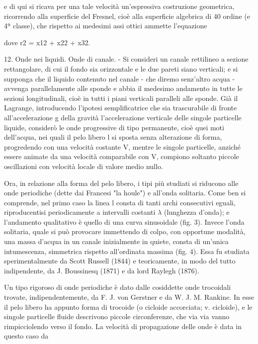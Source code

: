 \documentclass[a4paper]{article}
\begin{document}
e di qui si ricava per una tale velocità un'espressiva costruzione geometrica, ricorrendo alla superficie del Fresnel, cioè alla superficie algebrica di 40 ordine (e 4ª classe), che rispetto ai medesimi assi ottici ammette l'equazione

dove r2 = x12 + x22 + x32.

12. Onde nei liquidi. Onde di canale. - Si consideri un canale rettilineo a sezione rettangolare, di cui il fondo sia orizzontale e le due pareti siano verticali; e si supponga che il liquido contenuto nel canale - che diremo senz'altro acqua - avvenga parallelamente alle sponde e abbia il medesimo andamento in tutte le sezioni longitudinali, cioè in tutti i piani verticali paralleli alle sponde. Già il Lagrange, introducendo l'ipotesi semplificatrice che sia trascurabile di fronte all'accelerazione g della gravità l'accelerazione verticale delle singole particelle liquide, considerò le onde progressive di tipo permanente, cioè quei moti dell'acqua, nei quali il pelo libero l si sposta senza alterazione di forma, progredendo con una velocità costante V, mentre le singole particelle, anziché essere animate da una velocità comparabile con V, compiono soltanto piccole oscillazioni con velocità locale di valore medio nullo.

Ora, in relazione alla forma del pelo libero, i tipi più studiati si riducono alle onde periodiche (dette dai Francesi "la houle") e all'onda solitaria. Come ben si comprende, nel primo caso la linea l consta di tanti archi consecutivi eguali, riproducentisi periodicamente a intervalli costanti $\lambda$ (lunghezza d'onda); e l'andamento qualitativo è quello di una curva sinusoidale (fig. 3). Invece l'onda solitaria, quale si può provocare immettendo di colpo, con opportune modalità, una massa d'acqua in un canale inizialmente in quiete, consta di un'unica intumescenza, simmetrica rispetto all'ordinata massima (fig. 4). Essa fu studiata sperimentalmente da Scott Russell (1844) e teoricamente, in modo del tutto indipendente, da J. Boussinesq (1871) e da lord Raylegh (1876).

Un tipo rigoroso di onde periodiche è dato dalle cosiddette onde trocoidali trovate, indipendentemente, da F. J. von Gerstner e da W. J. M. Rankine. In esse il pelo libero ha appunto forma di trocoide (o cicloide accorciata; v. cicloide), e le singole particelle fluide descrivono piccole circonferenze, che via via vanno rimpicciolendo verso il fondo. La velocità di propagazione delle onde è data in questo caso da
\end{document}
